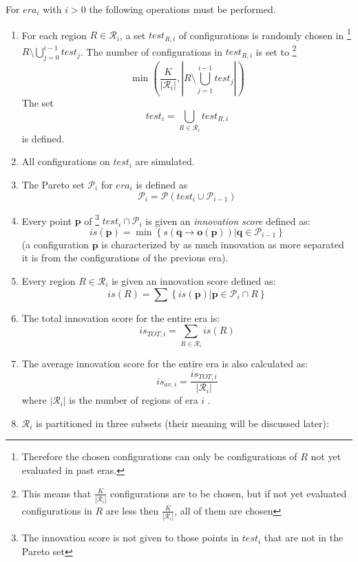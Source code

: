 For $era_{i}$ with $i>0$ the following operations must be performed.
\begin{enumerate}
\item \label{pers02.enu:K}For each region $R\in\mathcal{R}_{i}$, a set
$test_{R,i}$ of configurations is randomly chosen in%
\footnote{Therefore the chosen configurations can only be configurations of
$R$ not yet evaluated in past eras.%
} $R\setminus\bigcup_{j=0}^{i-1}test_{j}$. The number of configurations
in $test_{R,i}$ is set to%
\footnote{This means that $\frac{K}{\left|\mathcal{R}_{i}\right|}$ configurations
are to be chosen, but if not yet evaluated configurations in $R$
are less then $\frac{K}{\left|\mathcal{R}_{i}\right|}$, all of them
are chosen%
} 
\[
\min\left(\frac{K}{\left|\mathcal{R}_{i}\right|},\left|R\setminus\bigcup_{j=1}^{i-1}test_{j}\right|\right)
\]
The set 
\[
test_{i}=\bigcup_{R\in\mathcal{R}_{i}}test_{R,i}
\]
 is defined. 
\item All configurations on $test_{i}$ are simulated.
\item The Pareto set $\mathscr{P}_{i}$ for $era_{i}$ is defined as 
\[
\mathscr{P}_{i}=\mathscr{P}\left(test_{i}\cup\mathscr{P}_{i-1}\right)
\]

\item \label{pers02.enu:novelty_score_of_a_configuration}Every point $\mathbf{p}$
of%
\footnote{The innovation score is not given to those points in $test_{i}$ that
are not in the Pareto set%
} $test_{i}\cap\mathscr{P}_{i}$ is given an \emph{innovation score
}defined as:
\[
is\left(\mathbf{p}\right)=\min\left\{ \left.s\left(\mathbf{q}\rightarrow\mathbf{o}\left(\mathbf{p}\right)\right)\right|\mathbf{q}\in\mathscr{P}_{i-1}\right\} 
\]
 (a configuration $\mathbf{p}$ is characterized by as much innovation
as more separated it is from the configurations of the previous era)\@.
\item Every region $R\in\mathcal{R}_{i}$ is given an innovation score defined
as:
\[
is\left(R\right)=\sum\left\{ \left.is\left(\mathbf{p}\right)\right|\mathbf{p}\in\mathscr{P}_{i}\cap R\right\} 
\]

\item The total innovation score for the entire era is:
\[
is_{TOT,i}=\sum_{R\in\mathcal{R}_{i}}is\left(R\right)
\]

\item The average innovation score for the entire era is also calculated
as:
\[
is_{av,i}=\frac{is_{TOT,i}}{\left|\mathcal{R}_{i}\right|}
\]
where $\left|\mathcal{R}_{i}\right|$ is the number of regions of
era $i$ .
\item $\mathcal{R}_{i}$ is partitioned in three subsets (their meaning
will be discussed later):


\end{enumerate}
